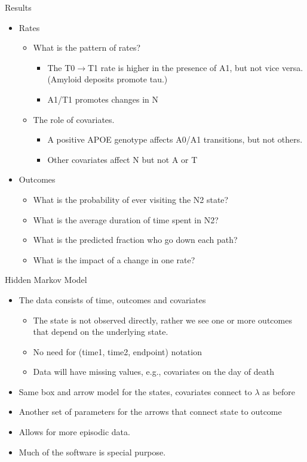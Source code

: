 \begin{frame}{Results}
  \begin{itemize}
    \item Rates
      \begin{itemize}
        \item What is the pattern of rates?
          \begin{itemize}
            \item The T0$\rightarrow$T1 rate is higher in the presence of
              A1, but not vice versa.  (Amyloid deposits promote tau.)
            \item A1/T1 promotes changes in N
          \end{itemize}
        \item The role of covariates.
          \begin{itemize}
            \item A positive APOE genotype affects A0/A1 transitions, but
              not others.
            \item Other covariates affect N but not A or T
          \end{itemize}
      \end{itemize}
    \item Outcomes
      \begin{itemize}
        \item What is the probability of ever visiting the N2 state? 
          \item What is the average duration of time spent in N2?
          \item What is the predicted fraction who go down each path?
        \item What is the impact of a change in one rate?
      \end{itemize}
  \end{itemize}
\end{frame}

\begin{frame}{Hidden Markov Model}
  \begin{itemize}
    \item  The data consists of time, outcomes and covariates
      \begin{itemize}
        \item The state is not observed directly, rather we see one or
          more outcomes that depend on the underlying state.
        \item No need for (time1, time2, endpoint) notation
        \item Data will have missing values, e.g., covariates on the day
          of death
      \end{itemize}
    \item Same box and arrow model for the states, covariates connect to
      $\lambda$ as before
    \item Another set of parameters for the arrows that connect state to outcome
    \item Allows for more episodic data.
    \item Much of the software is special purpose.
  \end{itemize}
\end{frame}

